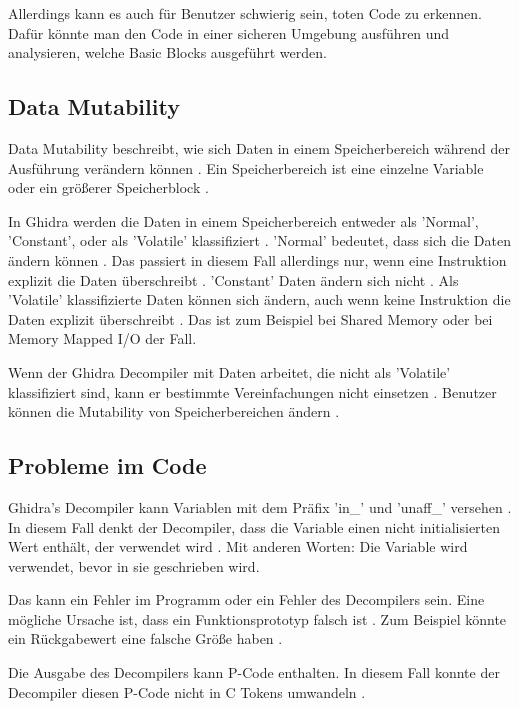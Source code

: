 Allerdings kann es auch für Benutzer schwierig sein, toten Code zu erkennen. Dafür könnte man den Code in einer sicheren Umgebung ausführen und analysieren, welche Basic Blocks ausgeführt werden.

\subsection{Data Mutability}

Data Mutability beschreibt, wie sich Daten in einem Speicherbereich während der Ausführung verändern können \cite{1}. Ein Speicherbereich ist eine einzelne Variable oder ein größerer Speicherblock \cite{1}.

In Ghidra werden die Daten in einem Speicherbereich entweder als 'Normal', 'Constant', oder als 'Volatile' klassifiziert \cite{1}. 'Normal' bedeutet, dass sich die Daten ändern können \cite{1}. Das passiert in diesem Fall allerdings nur, wenn eine Instruktion explizit die Daten überschreibt \cite{1}. 'Constant' Daten ändern sich nicht \cite{1}. Als 'Volatile' klassifizierte Daten können sich ändern, auch wenn keine Instruktion die Daten explizit überschreibt \cite{1}. Das ist zum Beispiel bei Shared Memory oder bei Memory Mapped I/O der Fall.

Wenn der Ghidra Decompiler mit Daten arbeitet, die nicht als 'Volatile' klassifiziert sind, kann er bestimmte Vereinfachungen nicht einsetzen \cite{15}. Benutzer können die Mutability von Speicherbereichen ändern \cite{1}.

\subsection{Probleme im Code}

Ghidra's Decompiler kann Variablen mit dem Präfix 'in\_' und 'unaff\_' versehen \cite{15}. In diesem Fall denkt der Decompiler, dass die Variable einen nicht initialisierten Wert enthält, der verwendet wird \cite{15}. Mit anderen Worten: Die Variable wird verwendet, bevor in sie geschrieben wird. 

Das kann ein Fehler im Programm oder ein Fehler des Decompilers sein. Eine mögliche Ursache ist, dass ein Funktionsprototyp falsch ist \cite{15}. Zum Beispiel könnte ein Rückgabewert eine falsche Größe haben \cite{15}.

Die Ausgabe des Decompilers kann P-Code enthalten. In diesem Fall konnte der Decompiler diesen P-Code nicht in C Tokens umwandeln \cite{15}.








